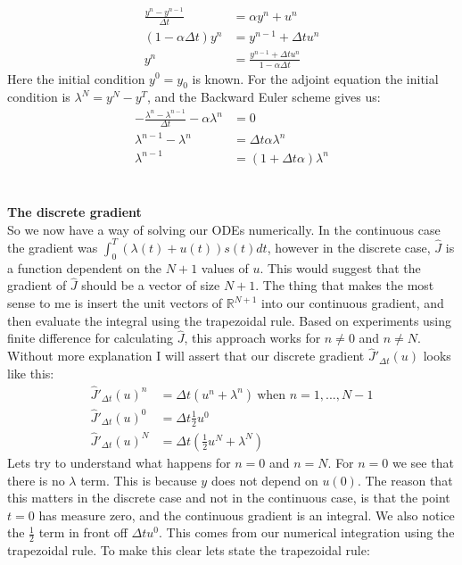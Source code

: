 \documentclass[11pt,a4paper]{report}
\begin{document}
\begin{align*}
\frac{y^n-y^{n-1}}{\Delta t} &= \alpha y^{n} + u^{n} \\
(1-\alpha\Delta t)y^{n} &= y^{n-1} +\Delta t u^{n} \\
y^n &=\frac{y^{n-1} +\Delta t u^{n}}{1-\alpha\Delta t}
\end{align*} 
Here the initial condition $y^0=y_0$ is known. For the adjoint equation the initial condition is $\lambda^N = y^N-y^T $, and the Backward Euler scheme gives us:
\begin{align*}
-\frac{\lambda^n-\lambda^{n-1}}{\Delta t} -\alpha\lambda^n &=0 \\
\lambda^{n-1} -\lambda^n &=\Delta t\alpha \lambda^n \\
\lambda^{n-1} &= (1+\Delta t\alpha)\lambda^n
\end{align*}
\\
\\
\textbf{The discrete gradient}
\\
So we now have a way of solving our ODEs numerically. In the continuous case the gradient was $\int_0^T(\lambda(t)+u(t))s(t)dt$, however in the discrete case, $\hat{J}$ is a function dependent on the $N+1$ values of $u$. This would suggest that the gradient of $\hat{J}$ should be a vector of size $N+1$. The thing that makes the most sense to me is insert the unit vectors of $\mathbb{R}^{N+1}$ into our continuous gradient, and then evaluate the integral using the trapezoidal rule. Based on experiments using finite difference for calculating $\hat{J}$, this approach works for $n\neq 0$ and $n\neq N$. Without more explanation I will assert that our discrete gradient $\hat{J}'_{\Delta t}(u)$ looks like this:
\begin{align*}
\hat{J}'_{\Delta t}(u)^n&=\Delta t(u^n+\lambda^n) \ \text{when $n=1,...,N-1$} \\
\hat{J}'_{\Delta t}(u)^0&=\Delta t \frac{1}{2}u^0 \\
\hat{J}'_{\Delta t}(u)^N&=\Delta t(\frac{1}{2}u^N+\lambda^N)
\end{align*} 
Lets try to understand what happens for $n=0$ and $n=N$. For $n=0$ we see that there is no $\lambda$ term. This is because $y$ does not depend on $u(0)$. The reason that this matters in the discrete case and not in the continuous case, is that the point $t=0$ has measure zero, and the continuous gradient is an integral. We also notice the $\frac{1}{2}$ term in front off $\Delta t u^0$. This comes from our numerical integration using the trapezoidal rule. To make this clear lets state the trapezoidal rule:
\end{document}
